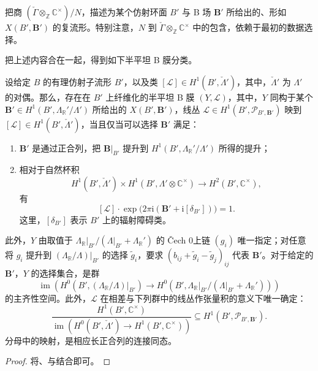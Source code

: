 \begin{exercise}\label{exer:6.62}
把商 $(\check\Gamma\otimes_{\mathbb Z}\mathbb C^\times)/N$，描述为某个仿射环面 $B'$ 与 B 场 $\mathbf B'$ 所给出的、形如 $X(B',\mathbf B')$ 的复流形。特别注意，$N$ 到 $\check\Gamma\otimes_{\mathbb Z}\mathbb C^\times$ 中的包含，依赖于最初的数据选择。
\end{exercise}

把上述内容合在一起，得到如下半平坦 B 膜分类。

\begin{theorem}\label{thm:6.63}
设给定 $B$ 的有理仿射子流形 $B'$，以及类 $[\mathcal L]\in H^1(B',\check\Lambda')$，其中，$\check\Lambda'$ 为 $\Lambda'$ 的对偶。那么，存在在 $B'$ 上纤维化的半平坦 B 膜 $(Y,\mathcal L)$，其中，$Y$ 同构于某个 $\mathbf B'\in H^1(B',\Lambda_{\mathbb R}'/\Lambda')$ 所给出的 $X(B',\mathbf B')$，线丛 $\mathcal L\in H^1(B',\mathcal P_{B',\mathbf B'})$ 映到 $[\mathcal L]\in H^1(B',\check\Lambda')$，当且仅当可以选择 $\mathbf B'$ 满足：
\begin{enumerate}[label=(\arabic*)]
\item $\mathbf B'$ 是通过正合列，把 $\mathbf B|_{B'}$ 提升到 $H^1(B',\Lambda_{\mathbb R}'/\Lambda')$ 所得的提升；
\item 相对于自然杯积
\[
H^1(B',\check\Lambda')\times H^1(B',\Lambda'\otimes\mathbb C^\times)
\longrightarrow H^2(B',\mathbb C^\times),
\]
有
\[
[\mathcal L]\cdot\exp\bigl(2\pi\mathrm i(\mathbf B'+\mathrm i[\delta_{B'}])\bigr)=1.
\]
这里，$[\delta_{B'}]$ 表示 $B'$ 上的辐射障碍类。
\end{enumerate}
此外，$Y$ 由取值于 $\Lambda_{\mathbb R}|_{B'}/(\Lambda|_{B'}+\Lambda_{\mathbb R}')$ 的 Čech 0上链 $(g_i)$ 唯一指定；对任意将 $g_i$ 提升到 $(\Lambda_{\mathbb R}/\Lambda)|_{B'}$ 的选择 $\widetilde g_i$，要求 $(b_{ij}+\widetilde g_i-\widetilde g_j)_{ij}$ 代表 $\mathbf B'$。对于给定的 $\mathbf B'$，$Y$ 的选择集合，是群
\[
\operatorname{im}\!\left(
H^0(B',(\Lambda_{\mathbb R}/\Lambda)|_{B'})
\longrightarrow H^0(B',\Lambda_{\mathbb R}|_{B'}/(\Lambda|_{B'}+\Lambda_{\mathbb R}'))
\right)
\]
的主齐性空间。此外，$\mathcal L$ 在相差与下列群中的线丛作张量积的意义下唯一确定：
\[
\frac{H^1(B',\mathbb C^\times)}
{\operatorname{im}\!\left(H^0(B',\check\Lambda')
\longrightarrow H^1(B',\mathbb C^\times)\right)}
\subseteq H^1(B',\mathcal P_{B',\mathbf B'}).
\]
分母中的映射，是相应长正合列的连接同态。
\end{theorem}
\begin{proof}
将、与结合即可。
\end{proof}

